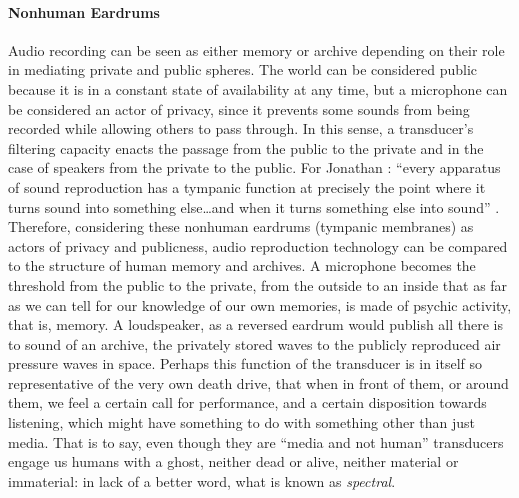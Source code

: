 \paragraph{Nonhuman Eardrums}
Audio recording can be seen as either memory or archive depending on their role in mediating private and public spheres. The world can be considered public because it is in a constant state of availability at any time, but a microphone can be considered an actor of privacy, since it prevents some sounds from being recorded while allowing others to pass through. In this sense, a transducer's filtering capacity enacts the passage from the public to the private and in the case of speakers from the private to the public. For Jonathan \textcite{Ste03:Aud}: ``every apparatus of sound reproduction has a tympanic function at precisely the point where it turns sound into something else\dots and when it turns something else into sound'' \parencite[34]{Ste03:Aud}. Therefore, considering these nonhuman eardrums (tympanic membranes) as actors of privacy and publicness, audio reproduction technology can be compared to the structure of human memory and archives. A microphone becomes the threshold from the public to the private, from the outside to an inside that as far as we can tell for our knowledge of our own memories, is made of psychic activity, that is, memory. A loudspeaker, as a reversed eardrum would publish all there is to sound of an archive, the privately stored waves to the publicly reproduced air pressure waves in space. Perhaps this function of the transducer is in itself so representative of the very own death drive, that when in front of them, or around them, we feel a certain call for performance, and a certain disposition towards listening, which might have something to do with something other than just media. That is to say, even though they are ``media and not human'' transducers engage us humans with a ghost, neither dead or alive, neither material or immaterial: in lack of a better word, what is known as \textit{spectral}. 

